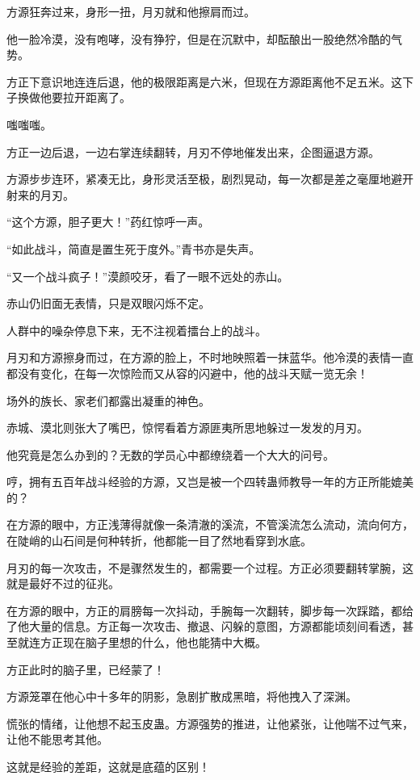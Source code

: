 \begin{this_body}
方源狂奔过来，身形一扭，月刃就和他擦肩而过。

他一脸冷漠，没有咆哮，没有狰狞，但是在沉默中，却酝酿出一股绝然冷酷的气势。

方正下意识地连连后退，他的极限距离是六米，但现在方源距离他不足五米。这下子换做他要拉开距离了。

嗤嗤嗤。

方正一边后退，一边右掌连续翻转，月刃不停地催发出来，企图逼退方源。

方源步步连环，紧凑无比，身形灵活至极，剧烈晃动，每一次都是差之毫厘地避开射来的月刃。

“这个方源，胆子更大！”药红惊呼一声。

“如此战斗，简直是置生死于度外。”青书亦是失声。

“又一个战斗疯子！”漠颜咬牙，看了一眼不远处的赤山。

赤山仍旧面无表情，只是双眼闪烁不定。

人群中的噪杂停息下来，无不注视着擂台上的战斗。

月刃和方源擦身而过，在方源的脸上，不时地映照着一抹蓝华。他冷漠的表情一直都没有变化，在每一次惊险而又从容的闪避中，他的战斗天赋一览无余！

场外的族长、家老们都露出凝重的神色。

赤城、漠北则张大了嘴巴，惊愕看着方源匪夷所思地躲过一发发的月刃。

他究竟是怎么办到的？无数的学员心中都缭绕着一个大大的问号。

哼，拥有五百年战斗经验的方源，又岂是被一个四转蛊师教导一年的方正所能媲美的？

在方源的眼中，方正浅薄得就像一条清澈的溪流，不管溪流怎么流动，流向何方，在陡峭的山石间是何种转折，他都能一目了然地看穿到水底。

月刃的每一次攻击，不是骤然发生的，都需要一个过程。方正必须要翻转掌腕，这就是最好不过的征兆。

在方源的眼中，方正的肩膀每一次抖动，手腕每一次翻转，脚步每一次踩踏，都给了他大量的信息。方正每一次攻击、撤退、闪躲的意图，方源都能顷刻间看透，甚至就连方正现在脑子里想的什么，他也能猜中大概。

方正此时的脑子里，已经蒙了！

方源笼罩在他心中十多年的阴影，急剧扩散成黑暗，将他拽入了深渊。

慌张的情绪，让他想不起玉皮蛊。方源强势的推进，让他紧张，让他喘不过气来，让他不能思考其他。

这就是经验的差距，这就是底蕴的区别！


\end{this_body}
